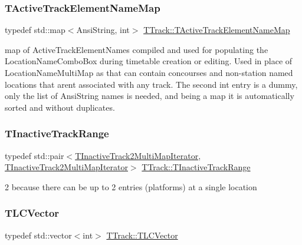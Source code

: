 \subsubsection{\texorpdfstring{T\+Active\+Track\+Element\+Name\+Map}{TActiveTrackElementNameMap}}
{\footnotesize\ttfamily typedef std\+::map$<$Ansi\+String, int$>$ \mbox{\hyperlink{class_t_track_af78e1d88c49cebd05b35fc408a5d9d2e}{T\+Track\+::\+T\+Active\+Track\+Element\+Name\+Map}}}

map of Active\+Track\+Element\+Names compiled and used for populating the Location\+Name\+Combo\+Box during timetable creation or editing. Used in place of Location\+Name\+Multi\+Map as that can contain concourses and non-\/station named locations that aren\textquotesingle{}t associated with any track. The second \textquotesingle{}int\textquotesingle{} entry is a dummy, only the list of Ansi\+String names is needed, and being a map it is automatically sorted and without duplicates. \mbox{\label{class_t_track_a1ac6dda244b2f5a6e27a458f28fc1b1c}} 
\subsubsection{\texorpdfstring{T\+Inactive\+Track\+Range}{TInactiveTrackRange}}
{\footnotesize\ttfamily typedef std\+::pair$<$\mbox{\hyperlink{class_t_track_a6072881896a545945cbcc26e8307bb68}{T\+Inactive\+Track2\+Multi\+Map\+Iterator}}, \mbox{\hyperlink{class_t_track_a6072881896a545945cbcc26e8307bb68}{T\+Inactive\+Track2\+Multi\+Map\+Iterator}}$>$ \mbox{\hyperlink{class_t_track_a1ac6dda244b2f5a6e27a458f28fc1b1c}{T\+Track\+::\+T\+Inactive\+Track\+Range}}}

\textquotesingle{}2\textquotesingle{} because there can be up to 2 entries (platforms) at a single location \mbox{\label{class_t_track_a84634d4f5d5ce1928526e8be27e74a72}} 
\subsubsection{\texorpdfstring{T\+L\+C\+Vector}{TLCVector}}
{\footnotesize\ttfamily typedef std\+::vector$<$int$>$ \mbox{\hyperlink{class_t_track_a84634d4f5d5ce1928526e8be27e74a72}{T\+Track\+::\+T\+L\+C\+Vector}}}

